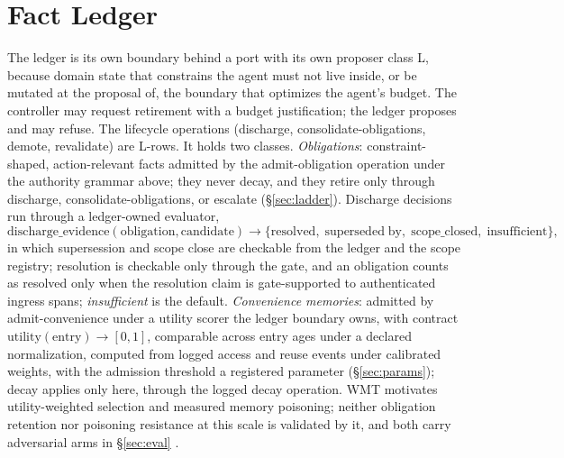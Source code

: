 \documentclass[11pt]{article}
\begin{document}
\section{Fact Ledger}
\label{sec:ledger}

The ledger is its own boundary behind a port with its own proposer class L, because domain state that constrains the agent must not live inside, or be mutated at the proposal of, the boundary that optimizes the agent's budget. The controller may request retirement with a budget justification; the ledger proposes and may refuse. The lifecycle operations (discharge, consolidate-obligations, demote, revalidate) are L-rows. It holds two classes. \emph{Obligations}: constraint-shaped, action-relevant facts admitted by the admit-obligation operation under the authority grammar above; they never decay, and they retire only through discharge, consolidate-obligations, or escalate (\S\ref{sec:ladder}). Discharge decisions run through a ledger-owned evaluator,
\[
\mathrm{discharge\_evidence}(\mathrm{obligation}, \mathrm{candidate}) \to \{\mathrm{resolved},\; \mathrm{superseded\;by},\; \mathrm{scope\_closed},\; \mathrm{insufficient}\},
\]
in which supersession and scope close are checkable from the ledger and the scope registry; resolution is checkable only through the gate, and an obligation counts as resolved only when the resolution claim is gate-supported to authenticated ingress spans; \emph{insufficient} is the default. \emph{Convenience memories}: admitted by admit-convenience under a utility scorer the ledger boundary owns, with contract $\mathrm{utility}(\mathrm{entry}) \to [0,1]$, comparable across entry ages under a declared normalization, computed from logged access and reuse events under calibrated weights, with the admission threshold a registered parameter (\S\ref{sec:params}); decay applies only here, through the logged decay operation. WMT motivates utility-weighted selection and measured memory poisoning; neither obligation retention nor poisoning resistance at this scale is validated by it, and both carry adversarial arms in \S\ref{sec:eval} \cite{wmt2026}.
\end{document}
